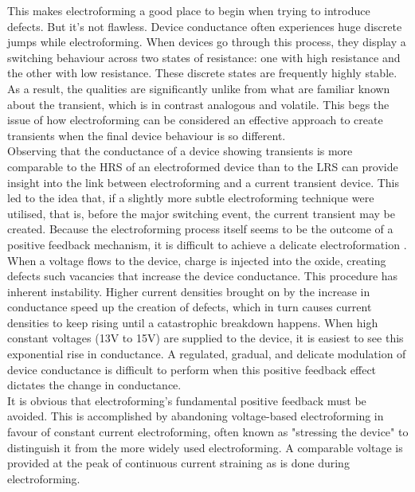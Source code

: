 \noindent This makes electroforming a good place to begin when trying to introduce defects. But it's not flawless. Device conductance often experiences huge discrete jumps while electroforming. When devices go through this process, they display a switching behaviour across two states of resistance: one with high resistance and the other with low resistance. These discrete states are frequently highly stable. As a result, the qualities are significantly unlike from what are familiar known about the transient, which is in contrast analogous and volatile. This begs the issue of how electroforming can be considered an effective approach to create transients when the final device behaviour is so different.\\


\noindent Observing that the conductance of a device showing transients is more comparable to the HRS of an electroformed device than to the LRS can provide insight into the link between electroforming and a current transient device. This led to the idea that, if a slightly more subtle electroforming technique were utilised, that is, before the major switching event, the current transient may be created. Because the electroforming process itself seems to be the outcome of a positive feedback mechanism, it is difficult to achieve a delicate electroformation \cite{kozicki2016electrochemical}.\\

\noindent When a voltage flows to the device, charge is injected into the oxide, creating defects such vacancies that increase the device conductance. This procedure has inherent instability. Higher current densities brought on by the increase in conductance speed up the creation of defects, which in turn causes current densities to keep rising until a catastrophic breakdown happens. When high constant voltages (13V to 15V) are supplied to the device, it is easiest to see this exponential rise in conductance. A regulated, gradual, and delicate modulation of device conductance is difficult to perform when this positive feedback effect dictates the change in conductance.\\

\noindent It is obvious that electroforming's fundamental positive feedback must be avoided. This is accomplished by abandoning voltage-based electroforming in favour of constant current electroforming, often known as "stressing the device" to distinguish it from the more widely used electroforming. A comparable voltage is provided at the peak of continuous current straining as is done during electroforming. \\

